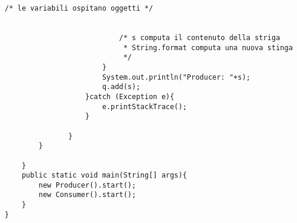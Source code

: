 \begin{lstlisting}[basicstyle=\small,]
                           /* le variabili ospitano oggetti */
                           

                           /* s computa il contenuto della striga
                            * String.format computa una nuova stinga
                            */
                       }
                       System.out.println("Producer: "+s);
                       q.add(s);
                   }catch (Exception e){
                       e.printStackTrace();
                   }

               }
        }

    }
    public static void main(String[] args){
        new Producer().start();
        new Consumer().start();
    }
}
\end{lstlisting}